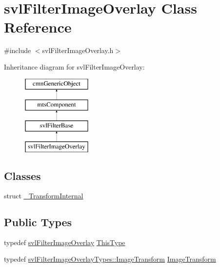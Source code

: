\hypertarget{classsvl_filter_image_overlay}{}\section{svl\+Filter\+Image\+Overlay Class Reference}
\label{classsvl_filter_image_overlay}


{\ttfamily \#include $<$svl\+Filter\+Image\+Overlay.\+h$>$}

Inheritance diagram for svl\+Filter\+Image\+Overlay\+:\begin{figure}[H]
\begin{center}
\leavevmode
\includegraphics[height=4.000000cm]{dc/db5/classsvl_filter_image_overlay}
\end{center}
\end{figure}
\subsection*{Classes}
\begin{DoxyCompactItemize}
\item 
struct \hyperlink{structsvl_filter_image_overlay_1_1___transform_internal}{\+\_\+\+Transform\+Internal}
\end{DoxyCompactItemize}
\subsection*{Public Types}
\begin{DoxyCompactItemize}
\item 
typedef \hyperlink{classsvl_filter_image_overlay}{svl\+Filter\+Image\+Overlay} \hyperlink{classsvl_filter_image_overlay_a9e4175de9ad9d65a5621a9fd78da6227}{This\+Type}
\item 
typedef \hyperlink{classsvl_filter_image_overlay_types_1_1_image_transform}{svl\+Filter\+Image\+Overlay\+Types\+::\+Image\+Transform} \hyperlink{classsvl_filter_image_overlay_a68354a171b2498de3aa1c5ba0ff2f002}{Image\+Transform}
\end{DoxyCompactItemize}
